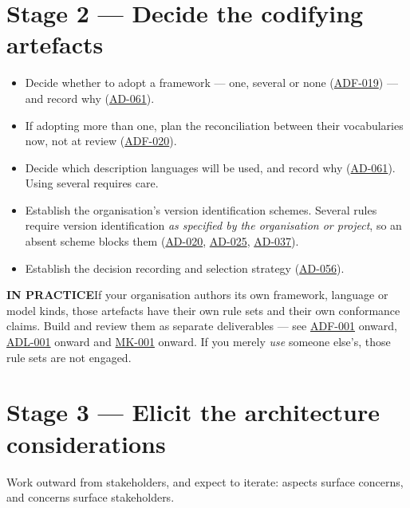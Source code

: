 \documentclass[11pt,a4paper]{report}
\newcommand{\calloutlead}[2]{{\sffamily\bfseries\footnotesize\color{#1}#2\quad}}
\newcommand{\tip}[1]{\begin{tipbox}\calloutlead{teal}{IN PRACTICE}#1\end{tipbox}}
\newcommand{\rref}[1]{\hyperref[rule:#1]{\textsf{\small #1}}}
\begin{document}
\section{Stage 2 --- Decide the codifying artefacts}

\begin{itemize}
  \item Decide whether to adopt a framework --- one, several or none
        (\rref{ADF-019}) --- and record why
        (\rref{AD-061}).
  \item If adopting more than one, plan the reconciliation between their
        vocabularies now, not at review (\rref{ADF-020}).
  \item Decide which description languages will be used, and record why
        (\rref{AD-061}). Using several requires care.
  \item Establish the organisation's version identification schemes. Several
        rules require version identification \emph{as specified by the
        organisation or project}, so an absent scheme blocks them
        (\rref{AD-020}, \rref{AD-025},
        \rref{AD-037}).
  \item Establish the decision recording and selection strategy
        (\rref{AD-056}).
\end{itemize}

\tip{If your organisation authors its own framework, language or model kinds,
those artefacts have their own rule sets and their own conformance claims. Build
and review them as separate deliverables --- see
\rref{ADF-001} onward, \rref{ADL-001} onward
and \rref{MK-001} onward. If you merely \emph{use} someone
else's, those rule sets are not engaged.}

\section{Stage 3 --- Elicit the architecture considerations}

Work outward from stakeholders, and expect to iterate: aspects surface concerns,
and concerns surface stakeholders.
\end{document}
